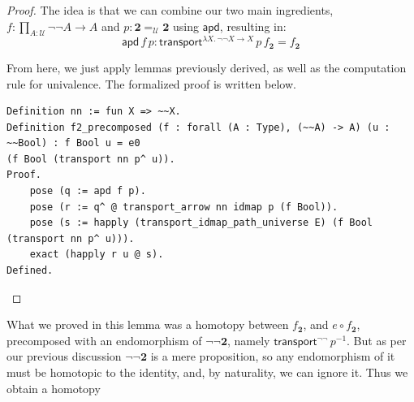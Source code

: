 \documentclass[12 pt]{amsart}
\theoremstyle{definition}
\theoremstyle{remark}
\newcommand{\Type}{\mathcal{U}}
\newcommand{\trans}{\mathsf{transport}}
\newcommand{\apd}{\mathsf{apd}}
\newcommand{\bool}{{\mathbf{2}}}
\newcommand{\ua}{{\mathsf{ua}}}
\newcommand{\happly}{{\mathsf{happly}}}
\newcommand{\id}{{\mathsf{id}}}
\newcommand{\no}{\lnot}
\newcommand{\transportarrow}{\mathsf{transport\_arrow}}
\begin{document}
\begin{proof}
The idea is that we can combine our two main ingredients, $ f : \prod_{A : \Type} \no\no A \to A$ and $p : \bool =_\Type \bool$ using $\apd$, resulting in:
\[ \apd\, f\, p : \trans^{\lambda X. \, \no\no X \to X}\, p \, f_\bool = f_\bool \]

From here, we just apply lemmas previously derived, as well as the computation rule for univalence. The formalized proof is written below.








\begin{lstlisting}
Definition nn := fun X => ~~X.
Definition f2_precomposed (f : forall (A : Type), (~~A) -> A) (u : ~~Bool) : f Bool u = e0 
(f Bool (transport nn p^ u)).
Proof.
    pose (q := apd f p).
    pose (r := q^ @ transport_arrow nn idmap p (f Bool)).
    pose (s := happly (transport_idmap_path_universe E) (f Bool (transport nn p^ u))).
    exact (happly r u @ s).
Defined.
\end{lstlisting}

\end{proof}

What we proved in this lemma was a homotopy between $f_\bool$, and $e \circ f_\bool$, precomposed with an endomorphism of $\no\no \bool$, namely $\trans^{\no\no}\,p^{-1}$. But as per our previous discussion $\no\no \bool$ is a mere proposition, so any endomorphism of it must be homotopic to the identity, and, by naturality, we can ignore it. Thus we obtain a homotopy
\end{document}
